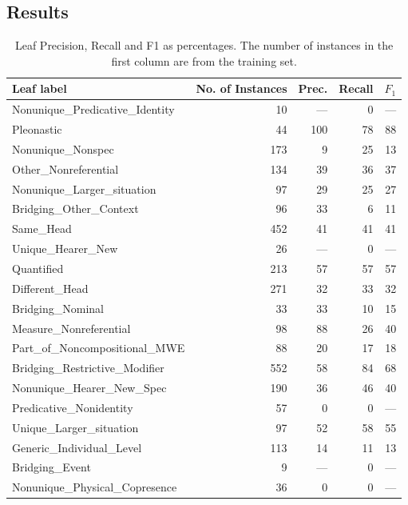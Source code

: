 \documentclass[11pt,letterpaper]{article}
\begin{document}
\subsection{Results}

\begin{table*}\small\centering
   \begin{tabular}{lrrrr}
      \bf{Leaf label} & \bf{No. of Instances} & \bf{Prec.} & \bf{Recall} & \bf{$F_1$} \\
      \midrule
Nonunique\_Predicative\_Identity & 10 & --- & 0 & --- \\
Pleonastic & 44 & 100 & 78 & 88 \\
Nonunique\_Nonspec & 173 & 9 & 25 & 13 \\
Other\_Nonreferential & 134 & 39 & 36 & 37 \\
Nonunique\_Larger\_situation & 97 & 29 & 25 & 27 \\
Bridging\_Other\_Context & 96 & 33 & 6 & 11 \\
Same\_Head & 452 & 41 & 41 & 41 \\
Unique\_Hearer\_New & 26 & --- & 0 & --- \\
Quantified & 213 & 57 & 57 & 57 \\
Different\_Head & 271 & 32 & 33 & 32 \\
Bridging\_Nominal & 33 & 33 & 10 & 15 \\
Measure\_Nonreferential & 98 & 88 & 26 & 40 \\
Part\_of\_Noncompositional\_MWE & 88 & 20 & 17 & 18 \\
Bridging\_Restrictive\_Modifier & 552 & 58 & 84 & 68 \\
Nonunique\_Hearer\_New\_Spec & 190 & 36 & 46 & 40 \\
Predicative\_Nonidentity & 57 & 0 & 0 & --- \\
Unique\_Larger\_situation & 97 & 52 & 58 & 55 \\
Generic\_Individual\_Level & 113 & 14 & 11 & 13 \\
Bridging\_Event & 9 & --- & 0 & --- \\
Nonunique\_Physical\_Copresence & 36 & 0 & 0 & --- \\

   \end{tabular}
   \caption{Leaf Precision, Recall and F1 as percentages. 
The number of instances in the first column are from the training set.}
   \label{tbl:leaf}
\end{table*}
\end{document}
